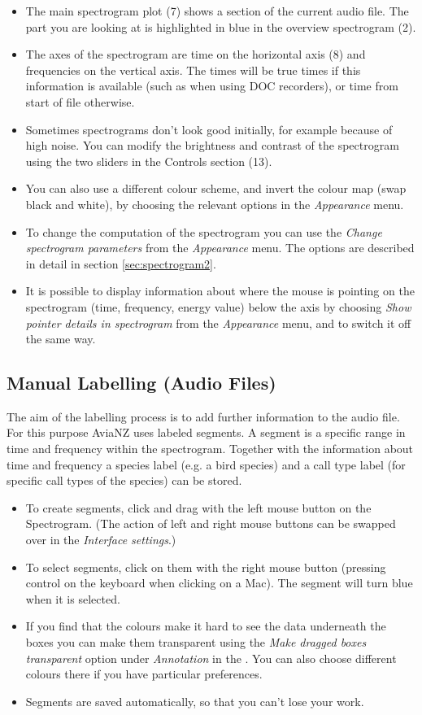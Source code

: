 \documentclass{scrartcl}
\begin{document}
\begin{itemize}
	\item The main spectrogram plot (7) shows a section of the current audio file. The part you are looking at is highlighted in blue in the overview spectrogram (2).
	\item The axes of the spectrogram are time on the horizontal axis (8) and frequencies on the vertical axis.
		The times will be true times if this information is available (such as when using DOC recorders), or time from start of file otherwise. 
	\item Sometimes spectrograms don't look good initially, for example because of high noise.
		You can modify the brightness and contrast of the spectrogram using the two sliders in the Controls section (13). 
	\item You can also use a different colour scheme, and invert the colour map (swap black and white), by choosing the relevant options in the \textit{Appearance} menu.
	\item To change the computation of the spectrogram you can use the \textit{Change spectrogram parameters} from the \textit{Appearance} menu. The options are described in detail in section \ref{sec:spectrogram2}.
	\item It is possible to display information about where the mouse is pointing on the spectrogram (time, frequency, energy value) below the axis by choosing \textit{Show pointer details in spectrogram} from the \textit{Appearance} menu, and to switch it off the same way.
\end{itemize}

\subsection{Manual Labelling (Audio Files)}\label{sec:ManualLabel}
The aim of the labelling process is to add further information to the audio file.
For this purpose AviaNZ uses labeled segments.
A segment is a specific range in time and frequency within the spectrogram.
Together with the information about time and frequency a species label (e.g. a bird species) and a call type label (for specific call types of the species) can be stored.

\begin{itemize}
	\item To create segments, click and drag with the left mouse button on the Spectrogram.
		(The action of left and right mouse buttons can be swapped over in the \textit{Interface settings}.)
	\item To select segments, click on them with the right mouse button (pressing control on the keyboard when clicking on a Mac).
		The segment will turn blue when it is selected.
	\item If you find that the colours make it hard to see the data underneath the boxes you can make them transparent using the \textit{Make dragged boxes transparent} option under \textit{Annotation} in the \textit{}.
		You can also choose different colours there if you have particular preferences.
	\item Segments are saved automatically, so that you can't lose your work.
\end{itemize}
\end{document}
